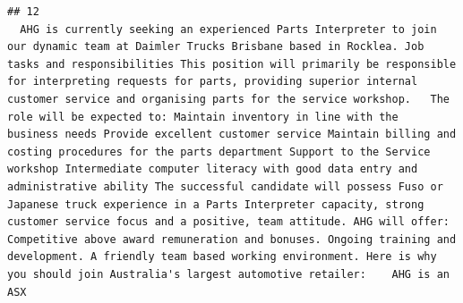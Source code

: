 \documentclass[11pt,a4paper,]{article}
\begin{document}
\begin{verbatim}
## 12                                                                                                                                                                                                                                                                                                                                                                                                                                                                                                                                                                                                                                                                                                                                                                                                                                                                                                                                                                                                                                                                                                                                                                                                                                                                                                                                                                                                                                                                                                                                                                                                                                                                                                                                                                                                                                                                                                                                                                                                                                                                                                                                                                                                                                                                                                                                                                               AHG is currently seeking an experienced Parts Interpreter to join our dynamic team at Daimler Trucks Brisbane based in Rocklea. Job tasks and responsibilities This position will primarily be responsible for interpreting requests for parts, providing superior internal customer service and organising parts for the service workshop.   The role will be expected to: Maintain inventory in line with the business needs Provide excellent customer service Maintain billing and costing procedures for the parts department Support to the Service workshop Intermediate computer literacy with good data entry and administrative ability The successful candidate will possess Fuso or Japanese truck experience in a Parts Interpreter capacity, strong customer service focus and a positive, team attitude. AHG will offer: Competitive above award remuneration and bonuses. Ongoing training and development. A friendly team based working environment. Here is why you should join Australia's largest automotive retailer:    AHG is an ASX 
\end{verbatim}
\end{document}

